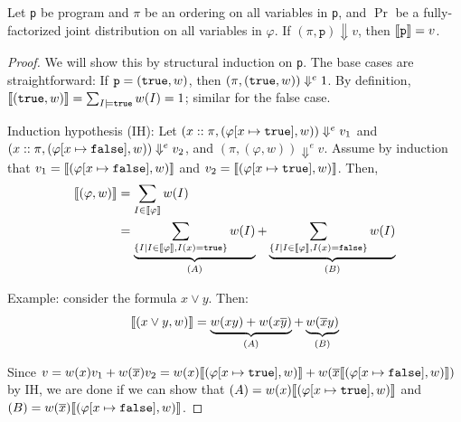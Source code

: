 \documentclass{tufte-handout}
\begin{document}
\begin{theorem}
  Let \texttt{p} be \prop{} program and $\pi$ be an ordering on all 
  variables in \texttt{p}, and $\Pr$ be a fully-factorized joint 
  distribution on all variables in $\varphi$. 
  If $(\pi, \texttt{p}) \Downarrow v$, then
   $\llbracket {\texttt{p}} \rrbracket = v$.
\end{theorem}
\begin{proof}
  We will show this by structural induction on \texttt{p}. 
  The base cases are straightforward: If $\texttt{p} = (\texttt{true}, w)$, then 
  $(\pi, (\texttt{true}, w)) \Downarrow^e 1$. By definition, $\llbracket {(\texttt{true}, w)} \rrbracket = \sum_{I \models \texttt{true}} w(I) = 1$; 
  similar for the false case.

  Induction hypothesis (IH): Let $(x::\pi, (\varphi[x \mapsto \texttt{true}], w)) \Downarrow^e v_1$ and 
  $(x::\pi, (\varphi[x \mapsto \texttt{false}], w)) \Downarrow^e v_2$, and $(\pi, (\varphi, w)) \Downarrow^e v$. Assume by induction that 
  $v_1 = \llbracket {(\varphi[x \mapsto \texttt{false}], w)} \rrbracket$ and $v_2 = \llbracket {(\varphi [x \mapsto \texttt{true}], w)} \rrbracket$. Then, 
  \begin{align*}
    \llbracket {(\varphi, w)} \rrbracket &= \sum_{I \in \llbracket {\varphi} \rrbracket} w(I) \\ 
    &= \underbrace{\sum_{\{I \mid I \in \llbracket {\varphi} \rrbracket, I(x) = \texttt{true}\}} w(I)}_{(A)} + 
\underbrace{\sum_{\{I \mid I \in \llbracket {\varphi} \rrbracket, I(x) = \texttt{false}\}} w(I)}_{(B)}
  \end{align*}

Example: consider the formula $x \lor y$. Then: \begin{align*} \llbracket {(x \lor
y, w)} \rrbracket = \underbrace{w(xy) + w(x\overline{y})}_{(A)} +
\underbrace{w(\overline{x}y)}_{(B)} \end{align*}

Since $v = w(x) v_1 + w(\overline{x})v_2 = w(x) \llbracket {(\varphi[x \mapsto \texttt{true}], w)} \rrbracket + 
w(\overline{x}\llbracket {(\varphi[x \mapsto \texttt{false}], w)} \rrbracket)$ by IH, we are done if we can show that 
$(A) = w(x) \llbracket {(\varphi[x \mapsto \texttt{true}], w)} \rrbracket$ and $(B) =
w(\overline{x})\llbracket {(\varphi[x \mapsto \texttt{false}], w)} \rrbracket$.


\end{proof}
\end{document}

